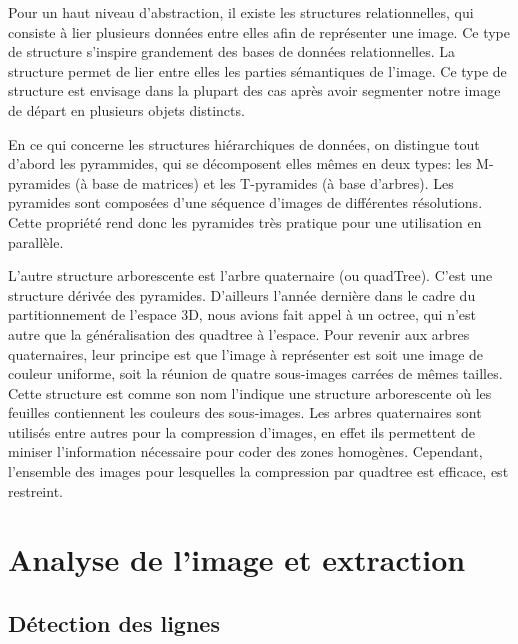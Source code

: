 \documentclass[]{report}
\begin{document}
      Pour un haut niveau d'abstraction, il existe les structures relationnelles, qui consiste à lier plusieurs données entre elles afin de représenter une image. Ce type de structure s'inspire grandement des bases de données relationnelles. La structure permet de lier entre elles les parties sémantiques de l'image. Ce type de structure est envisage dans la plupart des cas après avoir segmenter notre image de départ en plusieurs objets distincts.


      En ce qui concerne les structures hiérarchiques de données, on distingue tout d'abord les pyrammides, qui se décomposent elles mêmes en deux types: les M-pyramides (à base de matrices) et les T-pyramides (à base d'arbres). Les pyramides sont composées d'une séquence d'images de différentes résolutions. Cette propriété rend donc les pyramides très pratique pour une utilisation en parallèle.

      L'autre structure arborescente est l'arbre quaternaire (ou quadTree). C'est une structure dérivée des pyramides. D'ailleurs l'année dernière dans le cadre du partitionnement de l'espace 3D, nous avions fait appel à un octree, qui n'est autre que la généralisation des quadtree à l'espace. Pour revenir aux arbres quaternaires, leur principe est que l'image à représenter est soit une image de couleur uniforme, soit la réunion de quatre sous-images carrées de mêmes tailles. Cette structure est comme son nom l'indique une structure arborescente où les feuilles contiennent les couleurs des sous-images. Les arbres quaternaires sont utilisés entre autres pour la compression d'images, en effet ils permettent de miniser l'information nécessaire pour coder des zones homogènes. Cependant, l'ensemble des images pour lesquelles la compression par quadtree est efficace, est restreint.





	\chapter{Analyse de l'image et extraction} %
	\label{cha:analyse_de_l'image_et_extraction}

    \section{D\'etection des lignes} %
    \label{sec:d'etection_des_lignes}
\end{document}
